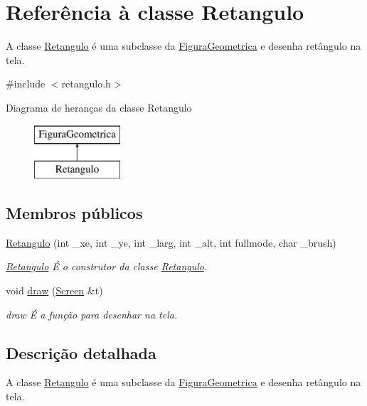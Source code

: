 \hypertarget{class_retangulo}{}\section{Referência à classe Retangulo}
\label{class_retangulo}


A classe \mbox{\hyperlink{class_retangulo}{Retangulo}} é uma subclasse da \mbox{\hyperlink{class_figura_geometrica}{Figura\+Geometrica}} e desenha retângulo na tela.  




{\ttfamily \#include $<$retangulo.\+h$>$}

Diagrama de heranças da classe Retangulo\begin{figure}[H]
\begin{center}
\leavevmode
\includegraphics[height=2.000000cm]{class_retangulo}
\end{center}
\end{figure}
\subsection*{Membros públicos}
\begin{DoxyCompactItemize}
\item 
\mbox{\hyperlink{class_retangulo_a98680c1886ca4caccfe37f7084bbf499}{Retangulo}} (int \+\_\+xe, int \+\_\+ye, int \+\_\+larg, int \+\_\+alt, int fullmode, char \+\_\+brush)
\begin{DoxyCompactList}\small\item\em \mbox{\hyperlink{class_retangulo}{Retangulo}} É o construtor da classe \mbox{\hyperlink{class_retangulo}{Retangulo}}. \end{DoxyCompactList}\item 
void \mbox{\hyperlink{class_retangulo_ac088dd6d3f4f3d3f80363a868c2e74f1}{draw}} (\mbox{\hyperlink{class_screen}{Screen}} \&t)
\begin{DoxyCompactList}\small\item\em draw É a função para desenhar na tela. \end{DoxyCompactList}\end{DoxyCompactItemize}


\subsection{Descrição detalhada}
A classe \mbox{\hyperlink{class_retangulo}{Retangulo}} é uma subclasse da \mbox{\hyperlink{class_figura_geometrica}{Figura\+Geometrica}} e desenha retângulo na tela. 

